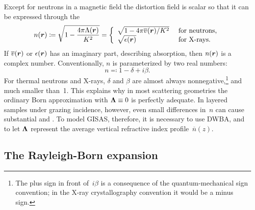 Except for neutrons in a magnetic field
the distortion field is scalar so
that it can be expressed through the 
%
%
%
\begin{equation}\label{EnkK}
  n(\bm{r})
  \coloneqq\sqrt{1-\frac{4\pi\Lambda(\bm{r})}{K^2}}
  = \left\{\begin{array}{ll}
       \sqrt{1-4\pi\overline{v}(\bm{r})/K^2} &\text{ for neutrons,}\\
       \sqrt{\epsilon(\bm{r})} &\text{ for X-rays.}
    \end{array}\right.
\end{equation}
If $\overline{v}(\bm{r})$ or $\epsilon(\bm{r})$ has an imaginary part, describing absorption,
%
then $n(\bm{r})$ is a complex number.
Conventionally, $n$ is parameterized by two real numbers:
\begin{equation}\label{Endb1}
  n \eqqcolon  1-\delta +i\beta.
\end{equation}
%
%
For thermal neutrons and X-rays,
$\delta$ and $\beta$ are almost always nonnegative,\footnote
{The plus sign in front of~$i\beta$ is a consequence of
the quantum-mechanical sign convention;
in the X-ray crystallography convention it would be a minus sign.
%
}
and much smaller than~1.
This explains why in most scattering geometries
%
the ordinary Born approximation
%
with $\bm{\Lambda}\equiv0$ is perfectly adequate.
In layered samples under grazing incidence,
%
however, even small differences in~$n$ can cause substantial
 and .
%
%
To model GISAS, therefore,
it is necessary to use DWBA,
%
and to let $\bm{\Lambda}$ represent
the average vertical refractive index profile~$\overline{n}(z)$.
%

\subsection{The Rayleigh-Born expansion}\label{SBornExpans}

